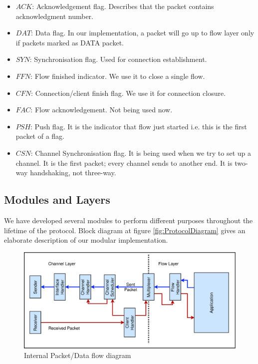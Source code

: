 \begin{itemize}
    \item \textbf{$ACK$}: Acknowledgement flag. Describes that the packet contains acknowledgment number.
    \item \textbf{$DAT$}: Data flag. In our implementation, a packet will go up to flow layer only if packets marked as DATA packet.
    \item \textbf{$SYN$}: Synchronisation flag. Used for connection establishment.
    \item \textbf{$FFN$}: Flow finished indicator. We use it to close a single flow.
    \item \textbf{$CFN$}: Connection/client finish flag. We use it for connection closure.
    \item \textbf{$FAC$}: Flow acknowledgement. Not being used now.
    \item \textbf{$PSH$}: Push flag. It is the indicator that flow just started i.e. this is the first packet of a flag.
    \item \textbf{$CSN$}: Channel Synchronisation flag. It is being used when we try to set up a channel. It is the first packet; every channel sends to another end. It is two-way handshaking, not three-way.
\end{itemize}


\subsection{Modules and Layers}
We have developed several modules to perform different purposes throughout the lifetime of the protocol. Block diagram at figure \ref{fig:ProtocolDiagram} gives an elaborate description of our modular implementation.

\begin{figure}[!h]
    \centering
    \includegraphics[width=.9\linewidth]{img/ModularDiagram}
    \caption{Internal Packet/Data flow diagram}
    \label{fig:ModularDiagram}
\end{figure}

